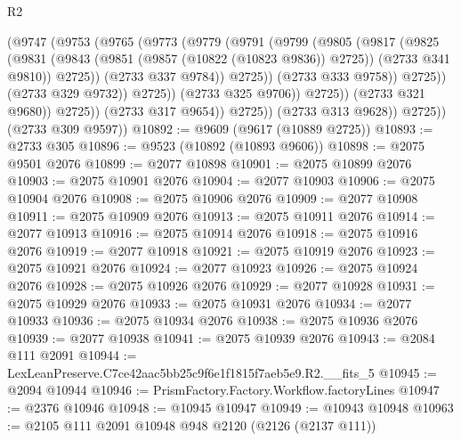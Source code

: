 \begin{lexlean}{R2}
\begin{coremodule}
                              (@9747
                                (@9753
                                  (@9765
                                    (@9773
                                      (@9779
                                        (@9791
                                          (@9799
                                            (@9805
                                              (@9817
                                                (@9825
                                                  (@9831
                                                    (@9843
                                                      (@9851 (@9857 (@10822 (@10823 @9836)) @2725))
                                                      (@2733 @341 @9810))
                                                    @2725))
                                                (@2733 @337 @9784))
                                              @2725))
                                          (@2733 @333 @9758))
                                        @2725))
                                    (@2733 @329 @9732))
                                  @2725))
                              (@2733 @325 @9706))
                            @2725))
                        (@2733 @321 @9680))
                      @2725))
                  (@2733 @317 @9654))
                @2725))
            (@2733 @313 @9628))
          @2725))
      (@2733 @309 @9597))
@10892 := @9609 (@9617 (@10889 @2725))
@10893 := @2733 @305
@10896 := @9523 (@10892 (@10893 @9606))
@10898 := @2075 @9501 @2076
@10899 := @2077 @10898
@10901 := @2075 @10899 @2076
@10903 := @2075 @10901 @2076
@10904 := @2077 @10903
@10906 := @2075 @10904 @2076
@10908 := @2075 @10906 @2076
@10909 := @2077 @10908
@10911 := @2075 @10909 @2076
@10913 := @2075 @10911 @2076
@10914 := @2077 @10913
@10916 := @2075 @10914 @2076
@10918 := @2075 @10916 @2076
@10919 := @2077 @10918
@10921 := @2075 @10919 @2076
@10923 := @2075 @10921 @2076
@10924 := @2077 @10923
@10926 := @2075 @10924 @2076
@10928 := @2075 @10926 @2076
@10929 := @2077 @10928
@10931 := @2075 @10929 @2076
@10933 := @2075 @10931 @2076
@10934 := @2077 @10933
@10936 := @2075 @10934 @2076
@10938 := @2075 @10936 @2076
@10939 := @2077 @10938
@10941 := @2075 @10939 @2076
@10943 := @2084 @111 @2091
@10944 := LexLeanPreserve.C7ce42aac5bb25c9f6e1f1815f7aeb5e9.R2.__fits_5
@10945 := @2094 @10944
@10946 := PrismFactory.Factory.Workflow.factoryLines
@10947 := @2376 @10946
@10948 := @10945 @10947
@10949 := @10943 @10948
@10963 := @2105
    @111
    @2091
    @10948
    @948
    @2120
    (@2126 (@2137 @111))

\end{coremodule}
\end{lexlean}

